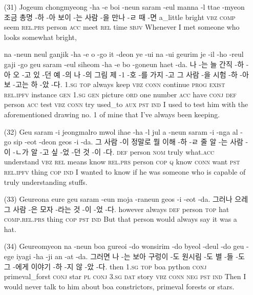 \begin{itemize}
\item [(31)]
\tgl
		{Jogeum chongmyeong -ha -e boi -neun saram -eul manna -l ttae -myeon}
		{조금 총명 -하 -아 보이 -는 사람 -을 만나 -ㄹ 때 -면}
		{a\_little	bright	\textsc{vbz}	\textsc{comp}	seem	\textsc{rel.prs}	person	\textsc{acc}	meet	\textsc{rel}	time	\textsc{sbjv}}
		{Whenever I met someone who looks somewhat bright,}
		
\tgl
		{na -neun neul ganjik -ha -e o -go it -deon ye -ui na -ui geurim je -il -ho -reul gaji -go geu saram -eul siheom -ha -e bo -goneun haet -da.}
		{나 -는 늘 간직 -하 -아 오 -고 있 -던 예 -의 나 -의 그림 제 -1 -호 -를 가지 -고 그 사람 -을 시험 -하 -아 보 -고는 하 -았 -다.}
		{\textsc{1.sg}	\textsc{top}	always	keep	\textsc{vbz}	\textsc{conn}	continue	\textsc{prog}	\textsc{exist}	\textsc{rel.ipfv}	instance	\textsc{gen}	\textsc{1.sg}	\textsc{gen}	picture	\textsc{ord}	one	number	\textsc{acc}	have	\textsc{conj}	\textsc{def}	person	\textsc{acc}	test	\textsc{vbz}	\textsc{conn}	try	used\_to	\textsc{aux}	\textsc{pst}	\textsc{ind}}
		{I used to test him with the aforementioned drawing no. 1 of mine that I've always been keeping.}

\item [(32)]
\tgl
		{Geu saram -i jeongmalro mwol ihae -ha -l jul a -neun saram -i -nga al -go sip -eot -deon geos -i -da.}
		{그 사람 -이 정말로 뭘 이해 -하 -ㄹ 줄 알 -는 사람 -이 -ㄴ가 알 -고 싶 -었 -던 것 -이 -다.}
		{\textsc{def}	person	\textsc{nom}	truly	what.\textsc{acc}	understand	\textsc{vbz}	\textsc{rel}	means	know	\textsc{rel.prs}	person	\textsc{cop}	\textsc{q}	know	\textsc{conn}	want	\textsc{pst}	\textsc{rel.ipfv}	thing	\textsc{cop}	\textsc{ind}}
		{I wanted to know if he was someone who is capable of truly understanding stuffs.}

\item [(33)]
\tgl
		{Geureona eure geu saram -eun moja -raneun geos -i -eot -da.}
		{그러나 으레 그 사람 -은 모자 -라는 것 -이 -었 -다.}
		{however	always	\textsc{def}	person	\textsc{top}	hat	\textsc{comp.rel.prs}	thing	\textsc{cop}	\textsc{pst}	\textsc{ind}}
		{But that person would always say it was a hat.}

\item [(34)]
\tgl
		{Geureomyeon na -neun boa gureoi -do wonsirim -do byeol -deul -do geu -ege iyagi -ha -ji an -at -da.}
		{그러면 나 -는 보아 구렁이 -도 원시림 -도 별 -들 -도 그 -에게 이야기 -하 -지 않 -았 -다.}
		{then	\textsc{1.sg}	\textsc{top}	boa	python	\textsc{conj}	primeval\_forst	\textsc{conj}	star	\textsc{pl}	\textsc{conj}	\textsc{3.sg}	\textsc{dat}	story	\textsc{vbz}	\textsc{conn}	\textsc{neg}	\textsc{pst}	\textsc{ind}}
		{Then I would never talk to him about boa constrictors, primeval forests or stars.}


\end{itemize}

